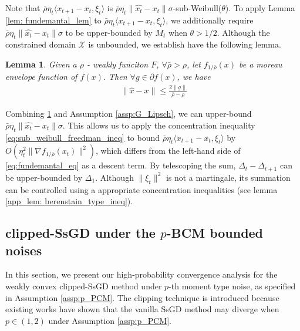 \documentclass{article}
\newtheorem{lemma}{Lemma}
\def \X {\mathcal{X}}
\begin{document}
Note that $\bar{\rho}\eta_t\langle x_{t+1} - x_t, \xi_t \rangle$ is $\bar{\rho}\eta_t\|\hat{x_t}-x_t\|\sigma$-sub-Weibull($\theta$). To apply Lemma \ref{lem: fundemantal_lem} to $\bar{\rho}\eta_t\langle x_{t+1} - x_t, \xi_t \rangle$, we additionally require $\bar{\rho}\eta_t\|\hat{x_t}-x_t\|\sigma$ to be upper-bounded by $M_t$ when $\theta>1/2$. Although the constrained domain $\X$ is unbounded, we establish have the following lemma.
\begin{lemma}\label{lem: bound_norm_hx_x}
     Given a $\rho$ - weakly funciton $F$, $\forall \bar{\rho} > \rho$, let $f_{1/\bar{\rho}} (x) $ be a moreau envelope function  of $f(x) $. Then $\forall g \in \partial f(x)$, we have
        \begin{align}~\label{eqn: bound_norm_hx_x}
            \|\hat{x}-x\| \leq \frac{2\|g\|}{\bar{\rho}-\rho}
        \end{align}
\end{lemma}
Combining \ref{lem: bound_norm_hx_x} and Assumption \ref{assp:G_Lipsch}, we can upper-bound $\bar{\rho}\eta_t\|\hat{x_t}-x_t\|\sigma$. This allows us to apply the concentration inequality \eqref{eq:sub_weibull_freedman_ineq} to bound $\bar{\rho}\eta_t\langle x_{t+1} - x_t, \xi_t \rangle$ by $O(\eta_t^2\|\nabla f_{1/\bar{\rho}}(x_t)\|^2)$, which differs from the left-hand side of \eqref{eq:fundemantal_eq} as a descent term. By telescoping the sum, $\Delta_t - \Delta_{t+1}$ can be upper-bounded by $\Delta_1$. Although $\|\xi_t\|^2$ is not a martingale, its summation can be controlled using a appropriate concentration inequalities (see lemma \ref{app_lem: berenstain_type_ineq}).

\subsection{clipped-SsGD under the $p$-BCM bounded noises}\label{sec:Cipped-SsGD_p_BCM}

In this section, we present our high-probability convergence analysis for the weakly convex clipped-SsGD method under $p$-th moment type noise, as specified in Assumption \ref{assp:p_PCM}. The clipping technique is introduced because existing works have shown that the vanilla SsGD method may diverge when $p \in (1, 2)$ under Assumption \ref{assp:p_PCM}.
\end{document}
